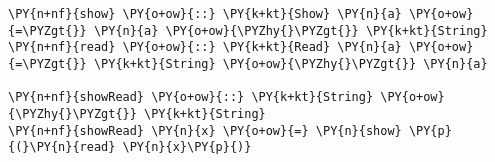 \begin{Verbatim}[commandchars=\\\{\}]
\PY{n+nf}{show} \PY{o+ow}{::} \PY{k+kt}{Show} \PY{n}{a} \PY{o+ow}{=\PYZgt{}} \PY{n}{a} \PY{o+ow}{\PYZhy{}\PYZgt{}} \PY{k+kt}{String}
\PY{n+nf}{read} \PY{o+ow}{::} \PY{k+kt}{Read} \PY{n}{a} \PY{o+ow}{=\PYZgt{}} \PY{k+kt}{String} \PY{o+ow}{\PYZhy{}\PYZgt{}} \PY{n}{a}

\PY{n+nf}{showRead} \PY{o+ow}{::} \PY{k+kt}{String} \PY{o+ow}{\PYZhy{}\PYZgt{}} \PY{k+kt}{String}
\PY{n+nf}{showRead} \PY{n}{x} \PY{o+ow}{=} \PY{n}{show} \PY{p}{(}\PY{n}{read} \PY{n}{x}\PY{p}{)}
\end{Verbatim}
